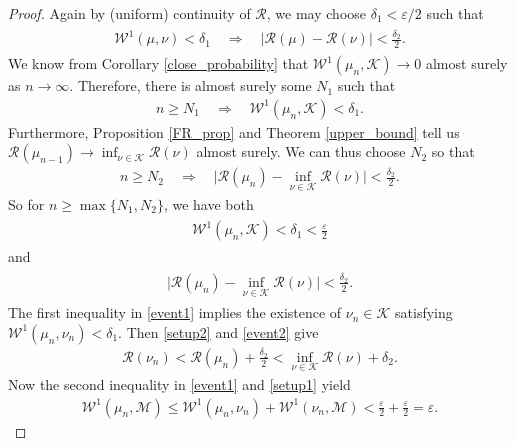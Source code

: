 \documentclass[11pt,reqno]{amsart}
\numberwithin{equation}{section}
\theoremstyle{definition}
\begin{document}
\begin{proof}
Again by (uniform) continuity of ${\mathcal{R}}$, we may choose $\delta_1 < {\varepsilon}/2$ such that
{\begin{align} \begin{split} {
{\mathcal{W}}^1(\mu,\nu) < \delta_1 \quad \Rightarrow \quad |{\mathcal{R}}(\mu) - {\mathcal{R}}(\nu)| < \frac{\delta_2}{2}. \label{setup2}
} \end{split} \end{align}}
We know from Corollary \ref{close_probability} that ${\mathcal{W}}^1(\mu_n,{\mathcal{K}}) \to 0$ almost surely as $n \to \infty$.
Therefore, there is almost surely some $N_1$ such that
{\begin{align*} {
n \geq N_1 \quad \Rightarrow \quad {\mathcal{W}}^1(\mu_n,{\mathcal{K}}) < \delta_1.
} \end{align*}}
Furthermore, Proposition \ref{FR_prop} and Theorem \ref{upper_bound} tell us ${\mathcal{R}}(\mu_{n-1}) \to \inf_{\nu \in {\mathcal{K}}} {\mathcal{R}}(\nu)$ almost surely.
We can thus choose $N_2$ so that
{\begin{align*} {
n \geq N_2 \quad \Rightarrow \quad \Big|{\mathcal{R}}(\mu_n) - \inf_{\nu \in {\mathcal{K}}} {\mathcal{R}}(\nu)\Big| < \frac{\delta_2}{2}.
} \end{align*}}
So for $n \geq \max\{N_1,N_2\}$, we have both
{\begin{align} \begin{split} {
{\mathcal{W}}^1(\mu_n,{\mathcal{K}}) < \delta_1 < \frac{\varepsilon}{2} \label{event1}
} \end{split} \end{align}}
and
{\begin{align} \begin{split} {
\Big|{\mathcal{R}}(\mu_n) - \inf_{\nu \in {\mathcal{K}}} {\mathcal{R}}(\nu)\Big| < \frac{\delta_2}{2}. \label{event2}
} \end{split} \end{align}}
The first inequality in \eqref{event1} implies the existence of $\nu_n \in {\mathcal{K}}$ satisfying ${\mathcal{W}}^1(\mu_n,\nu_n) < \delta_1$.
Then \eqref{setup2} and \eqref{event2} give
{\begin{align*} {
{\mathcal{R}}(\nu_n) < {\mathcal{R}}(\mu_n) + \frac{\delta_2}{2} < \inf_{\nu \in {\mathcal{K}}} {\mathcal{R}}(\nu) + \delta_2.
} \end{align*}}
Now the second inequality in \eqref{event1} and \eqref{setup1} yield
{\begin{align*} {
{\mathcal{W}}^1(\mu_n,{\mathcal{M}}) \leq {\mathcal{W}}^1(\mu_n,\nu_n) + {\mathcal{W}}^1(\nu_n,{\mathcal{M}}) < \frac{\varepsilon}{2} + \frac{\varepsilon}{2} = {\varepsilon}.
} \end{align*}}

\end{proof}
\end{document}
